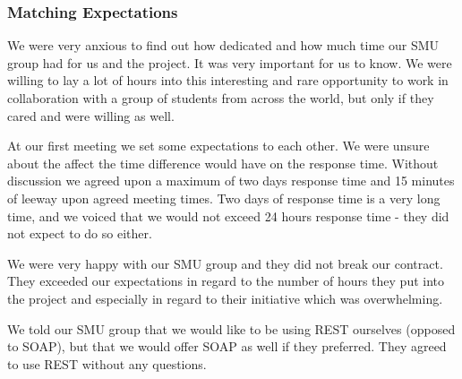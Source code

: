 \subsubsection{Matching Expectations}
We were very anxious to find out how dedicated and how much time our SMU group had for us and the project. It was very important for us to know. We were willing to lay a lot of hours into this interesting and rare opportunity to work in collaboration with a group of students from across the world, but only if they cared and were willing as well.

At our first meeting we set some expectations to each other. We were unsure about the affect the time difference would have on the response time. Without discussion we agreed upon a maximum of two days response time and 15 minutes of leeway upon agreed meeting times. Two days of response time is a very long time, and we voiced that we would not exceed 24 hours response time - they did not expect to do so either.

We were very happy with our SMU group and they did not break our contract. They exceeded our expectations in regard to the number of hours they put into the project and especially in regard to their initiative which was overwhelming.

We told our SMU group that we would like to be using REST ourselves (opposed to SOAP), but that we would offer SOAP as well if they preferred. They agreed to use REST without any questions.